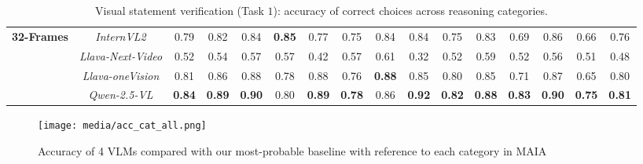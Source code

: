\begin{table*}[]
{\begin{tabular}{lc|c|cc|c|c|c|c|c|cc|cc|cc}
 

 \midrule
 \midrule

 
\multirow{4}{*}{\textbf{32-Frames}} & \textit{InternVL2} & {0.79} & {0.82} &  {0.84} &  \textbf{0.85}   &  {0.77} &  {0.75} &  {0.84}&  {0.84} &  {0.75} &  {0.83} &  {0.69} &  {0.86} &  {0.66} &  {0.76} \\
 &  \textit{Llava-Next-Video} &  {0.52} &  {0.54} &  {0.57} &  {0.57}   &  {0.42} &  {0.57} &  {0.61} &  {0.32}&  {0.52} &  {0.59}&  {0.52} &  {0.56} &  {0.51} &  {0.48} \\
 &  \textit{Llava-oneVision} &  {0.81} &  {0.86} &  {0.88} &  {0.78}   &  {0.88} &  {0.76} &  \textbf{0.88}&  {0.85} &  {0.80} &  {0.85} &  {0.71} &  {0.87} &  {0.65} &  {0.80} \\
 &  \textit{Qwen-2.5-VL} &  \textbf{0.84} &  \textbf{0.89} &  \textbf{0.90} &  {0.80}   &  \textbf{0.89} &  \textbf{0.78} &  {0.86}&  \textbf{0.92} &  \textbf{0.82} &  \textbf{0.88}&  \textbf{0.83} &  \textbf{0.90} &  \textbf{0.75} &  \textbf{0.81} \\ 
 \bottomrule
\end{tabular}%
}
\caption{\label{tab:task1_res_app}
    Visual statement verification (Task $1$): accuracy of correct choices across reasoning categories.
  }
\end{table*}



\begin{figure*}[h]

    \centering
  \texttt{[image: media/acc\_cat\_all.png]}
  \caption{Accuracy of 4 VLMs compared with our most-probable baseline with reference to each category in MAIA}
  \label{fig:MAIA_Task1_VLM_vs_LLMs_app}
\end{figure*}

